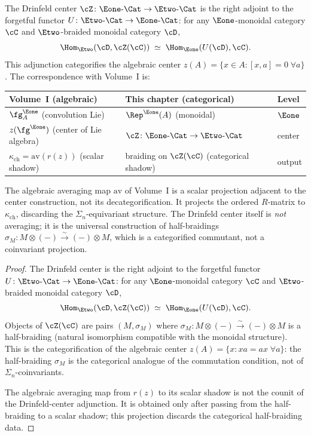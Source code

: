 \begin{proposition}
\label{prop:drinfeld-center-adjunction}
The Drinfeld center $\cZ \colon \Eone\text{-}\Cat \to
\Etwo\text{-}\Cat$ is the right adjoint to the forgetful functor
$U \colon \Etwo\text{-}\Cat \to \Eone\text{-}\Cat$: for any
$\Eone$-monoidal category $\cC$ and $\Etwo$-braided monoidal
category $\cD$,
\[
 \Hom_{\Etwo}(\cD, \cZ(\cC))
 \;\simeq\;
 \Hom_{\Eone}(U(\cD), \cC).
\]
This adjunction categorifies
the algebraic center $z(A) = \{x \in A : [x,a] = 0\;\forall a\}$.
The correspondence with Volume~I is:
\begin{center}
\begin{tabular}{lll}
\toprule
Volume~I (algebraic) & This chapter (categorical) & Level \\
\midrule
$\fg^{\Eone}_A$ (convolution Lie) & $\Rep^{\Eone}(A)$ (monoidal)
 & $\Eone$ \\
$z(\fg^{\Eone})$ (center of Lie algebra)
 & $\cZ \colon \Eone\text{-}\Cat \to \Etwo\text{-}\Cat$
 & center \\
$\kappa_{\mathrm{ch}} = \mathrm{av}(r(z))$ (scalar shadow)
 & braiding on $\cZ(\cC)$ (categorical shadow)
 & output \\
\bottomrule
\end{tabular}
\end{center}
The algebraic averaging map $\mathrm{av}$ of Volume~I is a scalar
projection adjacent to the center construction, not its
decategorification. It projects the ordered $R$-matrix to
$\kappa_{\mathrm{ch}}$, discarding the $\Sigma_n$-equivariant
structure. The Drinfeld center itself is \emph{not} averaging; it is
the universal construction
of half-braidings $\sigma_M \colon M \otimes (-) \xrightarrow{\sim}
(-) \otimes M$, which is a categorified commutant, not a
coinvariant projection.
\end{proposition}

\begin{proof}
The Drinfeld center is the right adjoint to the forgetful
functor $U \colon \Etwo\text{-}\Cat \to \Eone\text{-}\Cat$:
for any $\Eone$-monoidal category $\cC$ and
$\Etwo$-braided monoidal category $\cD$,
\[
 \Hom_{\Etwo}(\cD, \cZ(\cC))
 \;\simeq\;
 \Hom_{\Eone}(U(\cD), \cC).
\]
Objects of $\cZ(\cC)$ are pairs $(M, \sigma_M)$ where
$\sigma_M \colon M \otimes (-) \xrightarrow{\sim} (-) \otimes M$
is a half-braiding (natural isomorphism compatible with the
monoidal structure). This is the categorification of the
algebraic center $z(A) = \{x : xa = ax\;\forall a\}$: the
half-braiding $\sigma_M$ is the categorical analogue of the
commutation condition, not of $\Sigma_n$-coinvariants.

The algebraic averaging map from $r(z)$ to its scalar shadow
is not the counit
of the Drinfeld-center adjunction. It is obtained only after passing
from the half-braiding to a scalar shadow; this projection discards
the categorical half-braiding data.
\end{proof}


